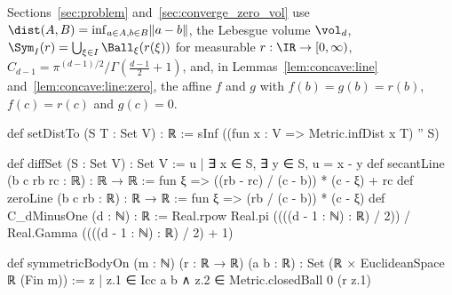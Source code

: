 Sections~\ref{sec:problem} and~\ref{sec:converge_zero_vol} use $\dist(A,B)=\inf_{a\in A,b\in B}\lVert a-b\rVert$, the Lebesgue volume $\vol_d$, $\Sym_I(r)=\bigcup_{\xi\in I}\Ball_\xi(r(\xi))$ for measurable $r:\IR\to[0,\infty)$, $C_{d-1}=\pi^{(d-1)/2}/\Gamma(\frac{d-1}{2}+1)$, and, in Lemmas~\ref{lem:concave:line} and~\ref{lem:concave:line:zero}, the affine $f$ and $g$ with $f(b)=g(b)=r(b)$, $f(c)=r(c)$ and $g(c)=0$.

\begin{leanlisting}
\begin{leancode}
def setDistTo (S T : Set V) : ℝ :=
  sInf ((fun x : V => Metric.infDist x T) '' S)
\end{leancode}
\begin{leancode}
def diffSet (S : Set V) : Set V := {u | ∃ x ∈ S, ∃ y ∈ S, u = x - y}
def secantLine (b c rb rc : ℝ) : ℝ → ℝ :=
  fun ξ => ((rb - rc) / (c - b)) * (c - ξ) + rc
def zeroLine (b c rb : ℝ) : ℝ → ℝ :=
  fun ξ => (rb / (c - b)) * (c - ξ)
def C_dMinusOne (d : ℕ) : ℝ :=
  Real.rpow Real.pi ((((d - 1 : ℕ) : ℝ) / 2)) /
    Real.Gamma ((((d - 1 : ℕ) : ℝ) / 2) + 1)
\end{leancode}
\begin{leancode}
def symmetricBodyOn (m : ℕ) (r : ℝ → ℝ) (a b : ℝ) :
    Set (ℝ × EuclideanSpace ℝ (Fin m)) :=
  {z | z.1 ∈ Icc a b ∧ z.2 ∈ Metric.closedBall 0 (r z.1)}
\end{leancode}
\end{leanlisting}

